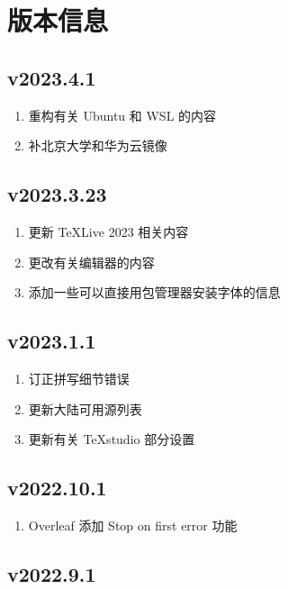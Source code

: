 
\chapter{版本信息}

\section*{v2023.4.1}

\begin{enumerate}
  \item 重构有关 Ubuntu 和 WSL 的内容
  \item 补北京大学和华为云镜像
\end{enumerate}

\section*{v2023.3.23}

\begin{enumerate}
  \item 更新 \TeX Live 2023 相关内容
  \item 更改有关编辑器的内容
  \item 添加一些可以直接用包管理器安装字体的信息
\end{enumerate}

\section*{v2023.1.1}

\begin{enumerate}
  \item 订正拼写细节错误
  \item 更新大陆可用源列表
  \item 更新有关 \TeX studio 部分设置
\end{enumerate}

\section*{v2022.10.1}

\begin{enumerate}
  \item Overleaf 添加 Stop on first error 功能
\end{enumerate}

\section*{v2022.9.1}

